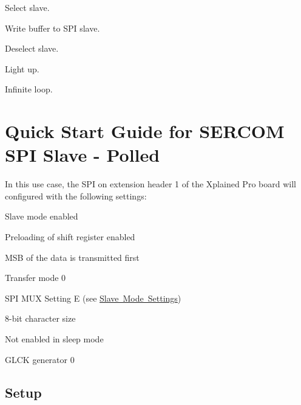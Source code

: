 \begin{DoxyEnumerate}
\item Select slave. 
\begin{DoxyCodeInclude}{0}
\end{DoxyCodeInclude}

\item Write buffer to S\+PI slave. 
\begin{DoxyCodeInclude}{0}
\end{DoxyCodeInclude}

\item Deselect slave. 
\begin{DoxyCodeInclude}{0}
\end{DoxyCodeInclude}

\item Light up. 
\begin{DoxyCodeInclude}{0}
\end{DoxyCodeInclude}

\item Infinite loop. 
\begin{DoxyCodeInclude}{0}
\end{DoxyCodeInclude}

\end{DoxyEnumerate}\hypertarget{asfdoc_sam0_sercom_spi_slave_basic_use}{}\section{Quick Start Guide for S\+E\+R\+C\+OM S\+PI Slave -\/ Polled}\label{asfdoc_sam0_sercom_spi_slave_basic_use}
In this use case, the S\+PI on extension header 1 of the Xplained Pro board will configured with the following settings\+:
\begin{DoxyItemize}
\item Slave mode enabled
\item Preloading of shift register enabled
\item M\+SB of the data is transmitted first
\item Transfer mode 0
\item S\+PI M\+UX Setting E (see \mbox{\hyperlink{asfdoc_sam0_sercom_spi_mux_settings_asfdoc_sam0_sercom_spi_mux_settings_slave}{Slave Mode Settings}})
\item 8-\/bit character size
\item Not enabled in sleep mode
\item G\+L\+CK generator 0
\end{DoxyItemize}\hypertarget{asfdoc_sam0_sercom_spi_slave_basic_use_asfdoc_sam0_sercom_spi_slave_basic_use_setup}{}\subsection{Setup}\label{asfdoc_sam0_sercom_spi_slave_basic_use_asfdoc_sam0_sercom_spi_slave_basic_use_setup}
